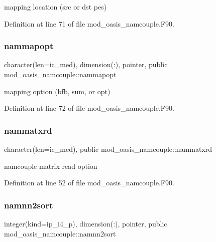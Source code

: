 mapping location (src or dst pes) 



Definition at line 71 of file mod\+\_\+oasis\+\_\+namcouple.\+F90.

\mbox{\label{namespacemod__oasis__namcouple_ad2554b4881fa63780dd5e6fe78d705ef}} 
\subsubsection{\texorpdfstring{nammapopt}{nammapopt}}
{\footnotesize\ttfamily character(len=ic\+\_\+med), dimension(\+:), pointer, public mod\+\_\+oasis\+\_\+namcouple\+::nammapopt}



mapping option (bfb, sum, or opt) 



Definition at line 72 of file mod\+\_\+oasis\+\_\+namcouple.\+F90.

\mbox{\label{namespacemod__oasis__namcouple_ad9ac6585de157a05d793636addf672a5}} 
\subsubsection{\texorpdfstring{nammatxrd}{nammatxrd}}
{\footnotesize\ttfamily character(len=ic\+\_\+med), public mod\+\_\+oasis\+\_\+namcouple\+::nammatxrd}



namcouple matrix read option 



Definition at line 52 of file mod\+\_\+oasis\+\_\+namcouple.\+F90.

\mbox{\label{namespacemod__oasis__namcouple_a0ace7c451d8658759b9c8d871926a76e}} 
\subsubsection{\texorpdfstring{namnn2sort}{namnn2sort}}
{\footnotesize\ttfamily integer(kind=ip\+\_\+i4\+\_\+p), dimension(\+:), pointer, public mod\+\_\+oasis\+\_\+namcouple\+::namnn2sort}



